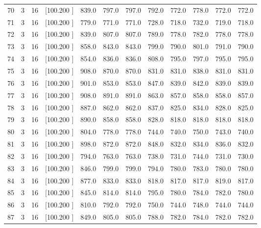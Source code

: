 \documentclass[12pt,a4paper]{article}
\begin{document}
\begin{center}
{\begin{tabular}{r r r r r r r r r r r r}
  70&  3& 16&[100.200   ]&   839.0&   797.0&   797.0&   792.0&   772.0&   778.0&   772.0&   772.0\\[-0.02in]
  71&  3& 16&[100.200   ]&   779.0&   771.0&   771.0&   728.0&   718.0&   732.0&   719.0&   718.0\\[-0.02in]
  72&  3& 16&[100.200   ]&   839.0&   807.0&   807.0&   789.0&   778.0&   782.0&   778.0&   778.0\\[-0.02in]
  73&  3& 16&[100.200   ]&   858.0&   843.0&   843.0&   799.0&   790.0&   801.0&   791.0&   790.0\\[-0.02in]
  74&  3& 16&[100.200   ]&   854.0&   836.0&   836.0&   808.0&   795.0&   797.0&   795.0&   795.0\\[-0.02in]
  75&  3& 16&[100.200   ]&   908.0&   870.0&   870.0&   831.0&   831.0&   838.0&   831.0&   831.0\\[-0.02in]
  76&  3& 16&[100.200   ]&   901.0&   853.0&   853.0&   847.0&   839.0&   842.0&   839.0&   839.0\\[-0.02in]
  77&  3& 16&[100.200   ]&   908.0&   891.0&   891.0&   863.0&   857.0&   858.0&   858.0&   857.0\\[-0.02in]
  78&  3& 16&[100.200   ]&   887.0&   862.0&   862.0&   837.0&   825.0&   834.0&   828.0&   825.0\\[-0.02in]
  79&  3& 16&[100.200   ]&   890.0&   858.0&   858.0&   828.0&   818.0&   818.0&   818.0&   818.0\\[-0.02in]
  80&  3& 16&[100.200   ]&   804.0&   778.0&   778.0&   744.0&   740.0&   750.0&   743.0&   740.0\\[-0.02in]
  81&  3& 16&[100.200   ]&   898.0&   872.0&   872.0&   848.0&   832.0&   834.0&   836.0&   832.0\\[-0.02in]
  82&  3& 16&[100.200   ]&   794.0&   763.0&   763.0&   738.0&   731.0&   744.0&   731.0&   730.0\\[-0.02in]
  83&  3& 16&[100.200   ]&   846.0&   799.0&   799.0&   794.0&   780.0&   783.0&   780.0&   780.0\\[-0.02in]
  84&  3& 16&[100.200   ]&   877.0&   833.0&   833.0&   818.0&   817.0&   817.0&   819.0&   817.0\\[-0.02in]
  85&  3& 16&[100.200   ]&   845.0&   814.0&   814.0&   795.0&   780.0&   784.0&   782.0&   780.0\\[-0.02in]
  86&  3& 16&[100.200   ]&   810.0&   792.0&   792.0&   750.0&   744.0&   748.0&   744.0&   744.0\\[-0.02in]
  87&  3& 16&[100.200   ]&   849.0&   805.0&   805.0&   788.0&   782.0&   784.0&   782.0&   782.0\\[-0.02in]

\end{tabular}}
\end{center}
\end{document}
